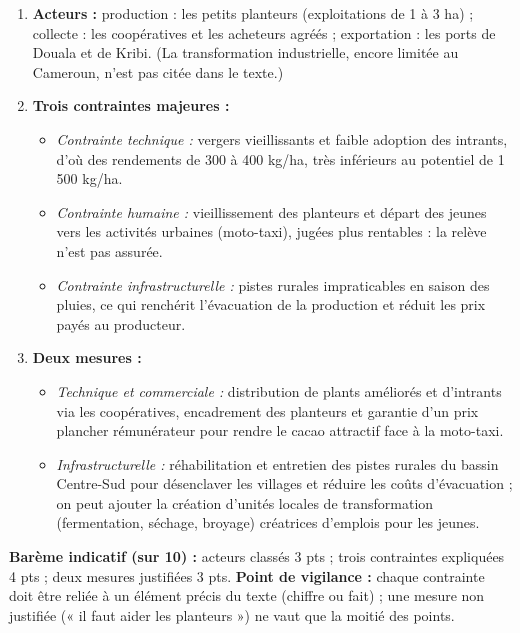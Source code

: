 \documentclass[11pt]{article}
\begin{document}
\begin{corrige}
\begin{enumerate}
\item \textbf{Acteurs :} production : les petits planteurs (exploitations de 1 à 3 ha) ; collecte : les coopératives et les acheteurs agréés ; exportation : les ports de Douala et de Kribi. (La transformation industrielle, encore limitée au Cameroun, n'est pas citée dans le texte.)
\item \textbf{Trois contraintes majeures :}
\begin{itemize}
\item \emph{Contrainte technique :} vergers vieillissants et faible adoption des intrants, d'où des rendements de 300 à 400 kg/ha, très inférieurs au potentiel de 1 500 kg/ha.
\item \emph{Contrainte humaine :} vieillissement des planteurs et départ des jeunes vers les activités urbaines (moto-taxi), jugées plus rentables : la relève n'est pas assurée.
\item \emph{Contrainte infrastructurelle :} pistes rurales impraticables en saison des pluies, ce qui renchérit l'évacuation de la production et réduit les prix payés au producteur.
\end{itemize}
\item \textbf{Deux mesures :}
\begin{itemize}
\item \emph{Technique et commerciale :} distribution de plants améliorés et d'intrants via les coopératives, encadrement des planteurs et garantie d'un prix plancher rémunérateur pour rendre le cacao attractif face à la moto-taxi.
\item \emph{Infrastructurelle :} réhabilitation et entretien des pistes rurales du bassin Centre-Sud pour désenclaver les villages et réduire les coûts d'évacuation ; on peut ajouter la création d'unités locales de transformation (fermentation, séchage, broyage) créatrices d'emplois pour les jeunes.
\end{itemize}
\end{enumerate}
\textbf{Barème indicatif (sur 10) :} acteurs classés 3 pts ; trois contraintes expliquées 4 pts ; deux mesures justifiées 3 pts. \textbf{Point de vigilance :} chaque contrainte doit être reliée à un élément précis du texte (chiffre ou fait) ; une mesure non justifiée (« il faut aider les planteurs ») ne vaut que la moitié des points.
\end{corrige}
\end{document}
